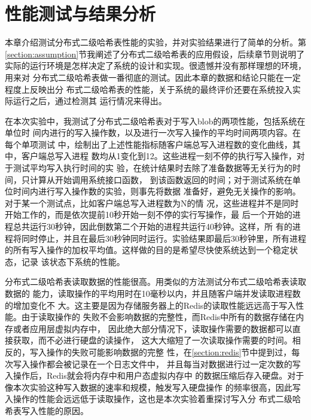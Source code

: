 \chapter{性能测试与结果分析}\label{chapter:lab}
本章介绍测试分布式二级哈希表性能的实验，并对实验结果进行了简单的分析。第
\ref{section:assumption}节我阐述了分布式二级哈希表的应用假设，后续章节则说明了
实际的运行环境是怎样决定了系统的设计和实现。很遗憾并没有那样理想的环境，用来对
分布式二级哈希表做一番彻底的测试。因此本章的数据和结论只能在一定程度上反映出分
布式二级哈希表的性能，关于系统的最终评价还要在系统投入实际运行之后，通过检测其
运行情况来得出。

在本次实验中，我测试了分布式二级哈希表对于写入blob的两项性能，包括系统在单位时
间内进行的写入操作数，以及进行一次写入操作的平均时间两项内容。在每个单项测试
中，绘制出了上述性能指标随客户端总写入进程数的变化曲线，其中，客户端总写入进程
数均从1变化到12。这些进程一刻不停的执行写入操作，对于测试平均写入执行时间的实
验，在统计结果时去除了准备数据等无关行为的时间，只计算从开始调用系统接口函数，
到该函数返回的时间；对于测试系统在单位时间内进行写入操作数的实验，则事先将数据
准备好，避免无关操作的影响。对于某一个测试点，比如客户端总写入进程数为N的情
况，这些进程并不是同时开始工作的，而是依次提前10秒开始一刻不停的实行写操作，最
后一个开始的进程总共运行30秒钟，因此倒数第二个开始的进程共运行40秒钟。这样，所
有的进程将同时停止，并且在最后30秒钟同时运行。实验结果即最后30秒钟里，所有进程
的所有写入操作的加权平均值。这样做的目的是希望尽快使系统达到一个稳定状态，记录
该状态下系统的性能。 

分布式二级哈希表读取数据的性能很高。用类似的方法测试分布式二级哈希表读取数据的
能力，读取操作的平均用时在10毫秒以内，并且随客户端并发读取进程数的增加变化不
大。这主要是因为存储服务器上的Redis的读取性能远远高于写入性能。由于读取操作的
失败不会影响数据的完整性，而Redis中所有的数据存储在内存或者应用层虚拟内存中，
因此绝大部分情况下，读取操作需要的数据都可以直接获取，而不必进行硬盘的读操作，
这大大缩短了一次读取操作需要的时间。相反的，写入操作的失败可能影响数据的完整
性，在\ref{section:redis}节中提到过，每次写入操作都会被记录在一个日志文件中，
并且每当对数据进行过一定次数的写入操作后，Redis就会将内存中和用户态虚拟内存中
的数据压缩后存入硬盘。对于像本次实验这种写入数据的速率和规模，触发写入硬盘操作
的频率很高，因此写入操作的性能会远远低于读取操作，这也是本次实验着重探讨写入分
布式二级哈希表写入性能的原因。

